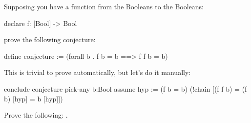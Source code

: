 \begin{exercise}[subtitle={\mbox{\rm{\em (SF Exercise 11.0.1, p. 25)}}}]
Supposing you have a function from the Booleans to the Booleans:
\begin{tcAthena}
declare f: [Bool] -> Bool
\end{tcAthena}
prove the following conjecture:
\begin{tcAthena}
define conjecture := (forall b . f b = b ==> f f b = b)
\end{tcAthena}
\end{exercise}
\begin{solution}
This is trivial to prove automatically, but let's do it manually: 
\begin{tcAthena}
conclude conjecture 
  pick-any b:Bool
    assume hyp := (f b = b)
      (!chain [(f f b) 
             = (f b)    [hyp]
             = b        [hyp]])
\end{tcAthena}
\end{solution}
\begin{exercise}[subtitle={\mbox{\rm{\em (SF Exercise 11.0.2, p. 25)}}}]
Prove the following: . 
\end{exercise}

